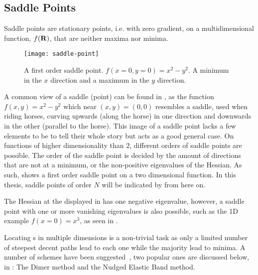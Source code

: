 \subsection{Saddle Points}
\label{sec:sps}

Saddle points are stationary points, i.e. with zero gradient, on a multidimensional function, $f({\mathrm{\mathbf{\bm{R}}}})$, that are neither maxima nor minima.

\begin{figure}[h]
  \begin{center}
    \texttt{[image: saddle-point]}
    \parbox{0.85\linewidth}{
      \caption{A first order saddle point.
      $f(x=0, y=0) = x^2 - y^2$. A minimum in the $x$ direction and a maximum in the $y$ direction.
      }
      \label{fig:2d-saddle-point}
    }
  \end{center}
\end{figure}

A common view of a saddle (point) can be found in , as the function $f(x, y) = x^2 - y^2$ which near $(x,y) = (0,0)$ resembles a saddle, used when riding horses, curving upwards (along the horse) in one direction and downwards in the other (parallel to the horse).
This image of a saddle point lacks a few elements to be to tell their whole story but acts as a good general case.
On functions of higher dimensionality than $2$, different orders of saddle points are possible.
The order of the saddle point is decided by the amount of directions that are not at a minimum, or the non-positive eigenvalues of the Hessian.
As such,  shows a first order saddle point on a two dimensional function.
In this thesis, saddle points of order $N$ will be indicated by  from here on.

The Hessian at the \sap{} displayed in  has one negative eigenvalue, however, a saddle point with one or more vanishing eigenvalues is also possible, such as the 1D example $f(x = 0) = x^3$, as seen in .

Locating \sap{}s in multiple dimensions is a non-trivial task as only a limited number of steepest decent paths lead to each one while the majority lead to minima.
A number of schemes have been suggested~\citemiss, two popular ones are discussed below, in : The Dimer method and the Nudged Elastic Band method.

